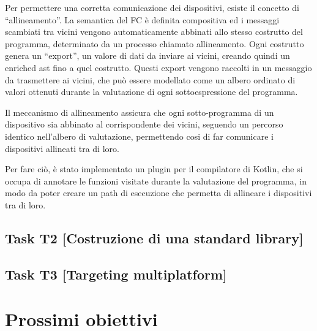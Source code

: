 \documentclass[13pt, a4paper]{article}
\begin{document}
Per permettere una corretta comunicazione dei dispositivi, esiste il concetto di ``allineamento''.
%
La semantica del \ac{FC} è definita compositiva ed i messaggi scambiati tra vicini vengono automaticamente abbinati
    allo stesso costrutto del programma, determinato da un processo chiamato allineamento.
%
Ogni costrutto genera un ``export'', un valore di dati da inviare ai vicini, creando quindi un enriched \ac{ast} fino a quel costrutto.
%
Questi export vengono raccolti in un messaggio da trasmettere ai vicini, che può essere modellato come
    un albero ordinato di valori ottenuti durante la valutazione di ogni sottoespressione del programma.

Il meccanismo di allineamento assicura che ogni sotto-programma di un dispositivo sia abbinato al corrispondente dei vicini,
    seguendo un percorso identico nell'albero di valutazione,
    permettendo cosi di far comunicare i dispositivi allineati tra di loro.

Per fare ciò, è stato implementato un plugin per il compilatore di Kotlin, che si occupa di annotare le funzioni visitate
    durante la valutazione del programma, in modo da poter creare un path di esecuzione che permetta di allineare i dispositivi
    tra di loro.

\subsection{Task T2 [Costruzione di una standard library]}\label{subsec:task-t2-[costruzione-di-una-standard-library]}

\subsection{Task T3 [Targeting multiplatform]}\label{subsec:task-t3-[targeting-multiplatform]}

\section{Prossimi obiettivi}\label{sec:prossimi-obiettivi}






\cite[none]{none}


\end{document}
